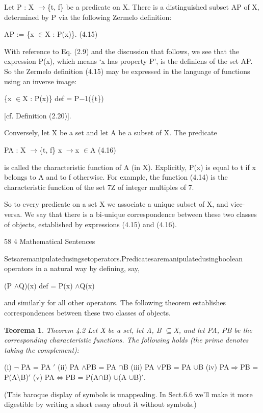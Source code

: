 \documentclass[11pt]{article}
\theoremstyle{plain}
\newtheorem{theorem}{Teorema}[section]
\theoremstyle{definition}
\begin{document}
Let P : X $\to$\{t, f\} be a predicate on X. There is a distinguished subset AP of X, determined by P via the following Zermelo definition:

AP := \{x $\in$X : P(x)\}. (4.15)

With reference to Eq. (2.9) and the discussion that follows, we see that the expression P(x), which means `x has property P', is the definiens of the set AP. So the Zermelo definition (4.15) may be expressed in the language of functions using an inverse image:

\{x $\in$X : P(x)\} def = P$-$1(\{t\})

[cf. Definition (2.20)].

Conversely, let X be a set and let A be a subset of X. The predicate

PA : X $\to$\{t, f\} x $\to$x $\in$A (4.16)

is called the characteristic function of A (in X). Explicitly, P(x) is equal to t if x belongs to A and to f otherwise. For example, the function (4.14) is the characteristic function of the set 7Z of integer multiples of 7.

So to every predicate on a set X we associate a unique subset of X, and vice-versa. We say that there is a bi-unique correspondence between these two classes of objects, established by expressions (4.15) and (4.16).

58 4 Mathematical Sentences

Setsaremanipulatedusingsetoperators.Predicatesaremanipulatedusingboolean operators in a natural way by defining, say,

(P $\land$Q)(x) def = P(x) $\land$Q(x)

and similarly for all other operators. The following theorem establishes correspondences between these two classes of objects.

\begin{theorem}
Theorem 4.2 Let X be a set, let A, B $\subseteq$X, and let PA, PB be the corresponding characteristic functions. The following holds (the prime denotes taking the complement):
\end{theorem}

(i) $\neg$ PA = PA $'$ (ii) PA $\land$PB = PA $\cap$B (iii) PA $\lor$PB = PA $\cup$B (iv) PA$\Rightarrow$PB = P(A$\setminus$B)$'$ (v) PA$\Leftrightarrow$PB = P(A$\cap$B) $\cup$(A $\cup$B)$'$.

(This baroque display of symbols is unappealing. In Sect.6.6 we'll make it more digestible by writing a short essay about it without symbols.)
\end{document}
